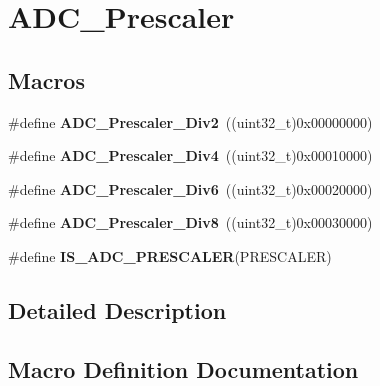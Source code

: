 \hypertarget{group___a_d_c___prescaler}{}\section{A\+D\+C\+\_\+\+Prescaler}
\label{group___a_d_c___prescaler}
\subsection*{Macros}
\begin{DoxyCompactItemize}
\item 
\hypertarget{group___a_d_c___prescaler_gaedf3593442796684ace09bce1c6a5dde}{}\#define {\bfseries A\+D\+C\+\_\+\+Prescaler\+\_\+\+Div2}~((uint32\+\_\+t)0x00000000)\label{group___a_d_c___prescaler_gaedf3593442796684ace09bce1c6a5dde}

\item 
\hypertarget{group___a_d_c___prescaler_ga8835521adcb2239c0bc0eec8f5eb8711}{}\#define {\bfseries A\+D\+C\+\_\+\+Prescaler\+\_\+\+Div4}~((uint32\+\_\+t)0x00010000)\label{group___a_d_c___prescaler_ga8835521adcb2239c0bc0eec8f5eb8711}

\item 
\hypertarget{group___a_d_c___prescaler_ga49cb7f0ac571b5a9105ac7c037559d63}{}\#define {\bfseries A\+D\+C\+\_\+\+Prescaler\+\_\+\+Div6}~((uint32\+\_\+t)0x00020000)\label{group___a_d_c___prescaler_ga49cb7f0ac571b5a9105ac7c037559d63}

\item 
\hypertarget{group___a_d_c___prescaler_gae56f649c15bfb0cbb87f6456a320664f}{}\#define {\bfseries A\+D\+C\+\_\+\+Prescaler\+\_\+\+Div8}~((uint32\+\_\+t)0x00030000)\label{group___a_d_c___prescaler_gae56f649c15bfb0cbb87f6456a320664f}

\item 
\#define {\bfseries I\+S\+\_\+\+A\+D\+C\+\_\+\+P\+R\+E\+S\+C\+A\+L\+E\+R}(P\+R\+E\+S\+C\+A\+L\+E\+R)
\end{DoxyCompactItemize}


\subsection{Detailed Description}


\subsection{Macro Definition Documentation}
\hypertarget{group___a_d_c___prescaler_gae69f71c595aef04fe0c0bbe9100d28ca}{}
